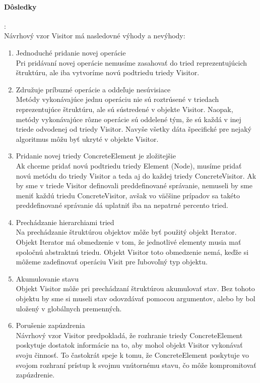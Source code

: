 		\paragraph{Dôsledky}:\\
			Návrhový vzor Visitor má nasledovné výhody a nevýhody:
			\begin{enumerate}
			\item Jednoduché pridanie novej operácie\\
				Pri pridávaní novej operácie nemusíme zasahovať do tried reprezentujúcich štruktúru, ale iba vytvoríme novú podtriedu triedy Visitor.
			\item Združuje príbuzné operácie a oddeľuje nesúvisiace\\
				Metódy vykonávajúce jednu operáciu nie sú roztrúsené v triedach reprezentujúce štruktúru, ale sú sústredené v objekte Visitor. Naopak, metódy vykonávajúce rôzne operácie sú oddelené tým, že sú každá v inej triede odvodenej od triedy Visitor. Navyše všetky dáta špecifické pre nejaký algoritmus môžu byť ukryté v objekte Visitor.
			\item Pridanie novej triedy ConcreteElement je zložitejšie\\
				Ak chceme pridať novú podtriedu triedy Element (Node), musíme pridať novú metódu do triedy Visitor a teda aj do každej triedy ConcreteVisitor. Ak by sme v triede Visitor definovali preddefinované správanie, nemuseli by sme meniť každú triedu ConcreteVisitor, avšak vo väčšine prípadov sa takéto preddefinované správanie dá uplatniť iba na nepatrné percento tried.
			\item Prechádzanie hierarchiami tried\\
				Na prechádzanie štruktúrou objektov môže byť použitý objekt Iterator. Objekt Iterator má obmedzenie v tom, že jednotlivé elementy musia mať spoločnú abstraktnú triedu. Objekt Visitor toto obmedzenie nemá, keďže si môžeme zadefinovať operáciu Visit pre ľubovoľný typ objektu.
			\item Akumulovanie stavu\\
				Objekt Visitor môže pri prechádzaní štruktúrou akumulovať stav. Bez tohoto objektu by sme si museli stav odovzdávať pomocou argumentov, alebo by bol uložený v globálnych premenných.
			\item Porušenie zapúzdrenia\\
				Návrhový vzor Visitor predpokladá, že rozhranie triedy ConcreteElement poskytuje dostatok informácie na to, aby mohol objekt Visitor vykonávať svoju činnosť. To častokrát speje k tomu, že ConcreteElement poskytuje vo svojom rozhraní prístup k svojmu vnútornému stavu, čo môže kompromitovať zapúzdrenie.
				\end{enumerate}
